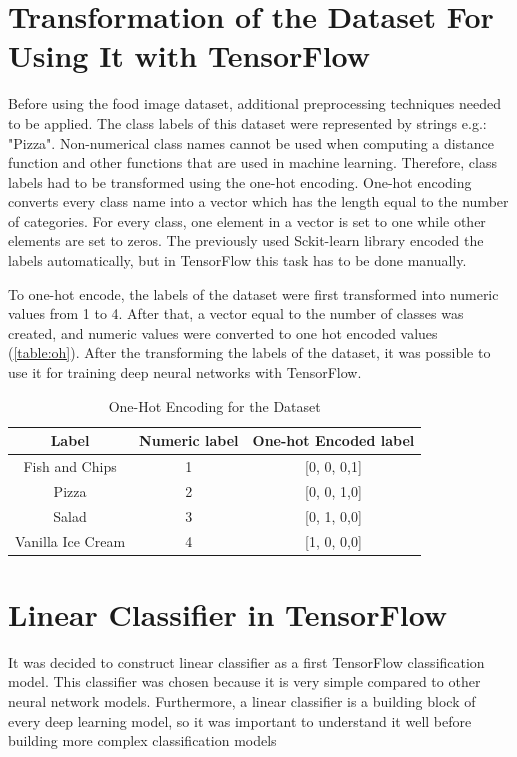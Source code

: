 \section{Transformation of the Dataset For Using It with TensorFlow}

Before using the food image dataset, additional preprocessing techniques needed to be applied. The class labels of this dataset were represented by strings e.g.: "Pizza". Non-numerical class names cannot be used when computing a distance function and other functions that are used in machine learning. Therefore, class labels had to be transformed using the one-hot encoding. One-hot encoding converts every class name into a vector which has the length equal to the number of categories. For every class, one element in a vector is set to one while other elements are set to zeros. The previously used Sckit-learn library encoded the labels automatically, but in TensorFlow this task has to be done manually.

To one-hot encode, the labels of the dataset were first transformed into numeric values from 1 to 4. After that, a vector equal to the number of classes was created, and numeric values were converted to one hot encoded values (\autoref{table:oh}). After the transforming the labels of the dataset, it was possible to use it for training deep neural networks with TensorFlow.


\begin{table}[h]
\begin{center}
\begin{tabular}{ |c|c|c| } 
 \hline
 Label &   Numeric label & One-hot Encoded label  \\   \hline
 Fish and Chips    &   1  &   [0, 0, 0,1]  \\
            Pizza   &   2 &    [0, 0, 1,0]    \\
            Salad    &   3 &    [0, 1, 0,0]    \\
Vanilla Ice Cream     &  4  &   [1, 0, 0,0]    \\ 
 \hline
\end{tabular}
\caption{One-Hot Encoding for the Dataset}
\label{table:oh}
\end{center}
\end{table}


\section{Linear Classifier in TensorFlow}
It was decided to construct linear classifier as a first TensorFlow classification model. This classifier was chosen because it is very simple compared to other neural network models. Furthermore, a linear classifier is a building block of every deep learning model, so it was  important to understand it well before building more complex classification models

